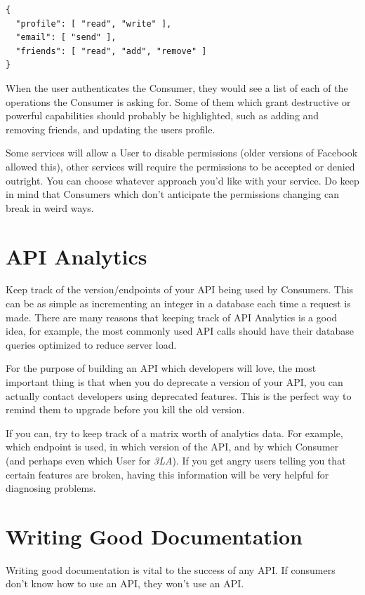 \documentclass{book}
\begin{document}
\begin{verbatim}
{
  "profile": [ "read", "write" ],
  "email": [ "send" ],
  "friends": [ "read", "add", "remove" ]
}
\end{verbatim}

When the user authenticates the Consumer, they would see a list of each of the operations the Consumer is asking for. Some of them which grant destructive or powerful capabilities should probably be highlighted, such as adding and removing friends, and updating the users profile.

Some services will allow a User to disable permissions (older versions of Facebook allowed this), other services will require the permissions to be accepted or denied outright. You can choose whatever approach you'd like with your service. Do keep in mind that Consumers which don't anticipate the permissions changing can break in weird ways.


\section{API Analytics}

Keep track of the version/endpoints of your API being used by Consumers. This can be as simple as incrementing an integer in a database each time a request is made. There are many reasons that keeping track of API Analytics is a good idea, for example, the most commonly used API calls should have their database queries optimized to reduce server load.

For the purpose of building an API which developers will love, the most important thing is that when you do deprecate a version of your API, you can actually contact developers using deprecated features. This is the perfect way to remind them to upgrade before you kill the old version.

If you can, try to keep track of a matrix worth of analytics data. For example, which endpoint is used, in which version of the API, and by which Consumer (and perhaps even which User for \emph{3LA}). If you get angry users telling you that certain features are broken, having this information will be very helpful for diagnosing problems.


\section{Writing Good Documentation}

Writing good documentation is vital to the success of any API. If consumers don't know how to use an API, they won't use an API.
\end{document}

